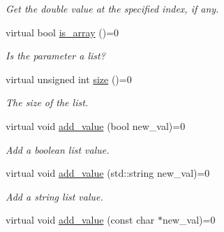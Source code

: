 \begin{DoxyCompactItemize}
\begin{DoxyCompactList}\small\item\em Get the double value at the specified index, if any. \end{DoxyCompactList}\item 
\hypertarget{classNeo4jQueryParameterInterface_a1356281c95e4d7783a05c79e362553f4}{virtual bool \hyperlink{classNeo4jQueryParameterInterface_a1356281c95e4d7783a05c79e362553f4}{is\-\_\-array} ()=0}\label{classNeo4jQueryParameterInterface_a1356281c95e4d7783a05c79e362553f4}

\begin{DoxyCompactList}\small\item\em Is the parameter a list? \end{DoxyCompactList}\item 
\hypertarget{classNeo4jQueryParameterInterface_ab6f89b2c1e63688a4524e69c37d4bf77}{virtual unsigned int \hyperlink{classNeo4jQueryParameterInterface_ab6f89b2c1e63688a4524e69c37d4bf77}{size} ()=0}\label{classNeo4jQueryParameterInterface_ab6f89b2c1e63688a4524e69c37d4bf77}

\begin{DoxyCompactList}\small\item\em The size of the list. \end{DoxyCompactList}\item 
\hypertarget{classNeo4jQueryParameterInterface_af44834a5e9b97dc9da3f9842cda46d1a}{virtual void \hyperlink{classNeo4jQueryParameterInterface_af44834a5e9b97dc9da3f9842cda46d1a}{add\-\_\-value} (bool new\-\_\-val)=0}\label{classNeo4jQueryParameterInterface_af44834a5e9b97dc9da3f9842cda46d1a}

\begin{DoxyCompactList}\small\item\em Add a boolean list value. \end{DoxyCompactList}\item 
\hypertarget{classNeo4jQueryParameterInterface_a6d883d5460cb6a20b10d4e657666123e}{virtual void \hyperlink{classNeo4jQueryParameterInterface_a6d883d5460cb6a20b10d4e657666123e}{add\-\_\-value} (std\-::string new\-\_\-val)=0}\label{classNeo4jQueryParameterInterface_a6d883d5460cb6a20b10d4e657666123e}

\begin{DoxyCompactList}\small\item\em Add a string list value. \end{DoxyCompactList}\item 
\hypertarget{classNeo4jQueryParameterInterface_a563efe2fedb2942bad6c882271186c34}{virtual void \hyperlink{classNeo4jQueryParameterInterface_a563efe2fedb2942bad6c882271186c34}{add\-\_\-value} (const char $\ast$new\-\_\-val)=0}\label{classNeo4jQueryParameterInterface_a563efe2fedb2942bad6c882271186c34}


\end{DoxyCompactItemize}

